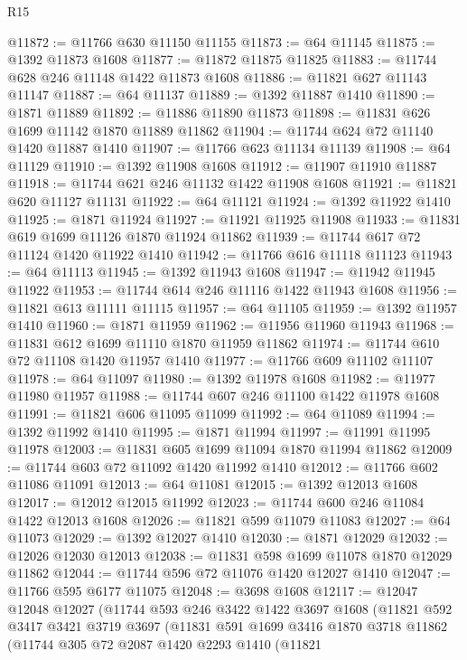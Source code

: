 \begin{lexlean}{R15}
\begin{coremodule}
@11872 := @11766 @630 @11150 @11155
@11873 := @64 @11145
@11875 := @1392 @11873 @1608
@11877 := @11872 @11875 @11825
@11883 := @11744 @628 @246 @11148 @1422 @11873 @1608
@11886 := @11821 @627 @11143 @11147
@11887 := @64 @11137
@11889 := @1392 @11887 @1410
@11890 := @1871 @11889
@11892 := @11886 @11890 @11873
@11898 := @11831 @626 @1699 @11142 @1870 @11889 @11862
@11904 := @11744 @624 @72 @11140 @1420 @11887 @1410
@11907 := @11766 @623 @11134 @11139
@11908 := @64 @11129
@11910 := @1392 @11908 @1608
@11912 := @11907 @11910 @11887
@11918 := @11744 @621 @246 @11132 @1422 @11908 @1608
@11921 := @11821 @620 @11127 @11131
@11922 := @64 @11121
@11924 := @1392 @11922 @1410
@11925 := @1871 @11924
@11927 := @11921 @11925 @11908
@11933 := @11831 @619 @1699 @11126 @1870 @11924 @11862
@11939 := @11744 @617 @72 @11124 @1420 @11922 @1410
@11942 := @11766 @616 @11118 @11123
@11943 := @64 @11113
@11945 := @1392 @11943 @1608
@11947 := @11942 @11945 @11922
@11953 := @11744 @614 @246 @11116 @1422 @11943 @1608
@11956 := @11821 @613 @11111 @11115
@11957 := @64 @11105
@11959 := @1392 @11957 @1410
@11960 := @1871 @11959
@11962 := @11956 @11960 @11943
@11968 := @11831 @612 @1699 @11110 @1870 @11959 @11862
@11974 := @11744 @610 @72 @11108 @1420 @11957 @1410
@11977 := @11766 @609 @11102 @11107
@11978 := @64 @11097
@11980 := @1392 @11978 @1608
@11982 := @11977 @11980 @11957
@11988 := @11744 @607 @246 @11100 @1422 @11978 @1608
@11991 := @11821 @606 @11095 @11099
@11992 := @64 @11089
@11994 := @1392 @11992 @1410
@11995 := @1871 @11994
@11997 := @11991 @11995 @11978
@12003 := @11831 @605 @1699 @11094 @1870 @11994 @11862
@12009 := @11744 @603 @72 @11092 @1420 @11992 @1410
@12012 := @11766 @602 @11086 @11091
@12013 := @64 @11081
@12015 := @1392 @12013 @1608
@12017 := @12012 @12015 @11992
@12023 := @11744 @600 @246 @11084 @1422 @12013 @1608
@12026 := @11821 @599 @11079 @11083
@12027 := @64 @11073
@12029 := @1392 @12027 @1410
@12030 := @1871 @12029
@12032 := @12026 @12030 @12013
@12038 := @11831 @598 @1699 @11078 @1870 @12029 @11862
@12044 := @11744 @596 @72 @11076 @1420 @12027 @1410
@12047 := @11766 @595 @6177 @11075
@12048 := @3698 @1608
@12117 := @12047
    @12048
    @12027
    (@11744
      @593
      @246
      @3422
      @1422
      @3697
      @1608
      (@11821
        @592
        @3417
        @3421
        @3719
        @3697
        (@11831
          @591
          @1699
          @3416
          @1870
          @3718
          @11862
          (@11744
            @305
            @72
            @2087
            @1420
            @2293
            @1410
            (@11821

\end{coremodule}
\end{lexlean}
